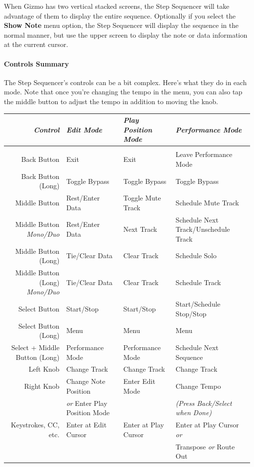 \documentclass{article}
\begin{document}
When Gizmo has two vertical stacked screens, the Step Sequencer will take advantage of them to display the entire sequence. Optionally if you select the {\bf Show Note} menu option, the Step Sequencer will display the sequence in the normal manner, but use the upper screen to display the note or data information at the current cursor.

\paragraph{Controls Summary}  The Step Sequencer's controls can be a bit complex.  Here's what they do in each mode.  Note that once you're changing the tempo in the menu, you can also tap the middle button to adjust the tempo in addition to moving the knob.

\vspace{1em}
\hspace{-3.5em} {\small
\begin{tabular}{@{}rlll@{}}
\it Control					& \it Edit Mode	& \it Play Position Mode	& \it Performance Mode\\
\hline\\[-0.5em]
Back Button				& Exit  & Exit & Leave Performance Mode\\
Back Button (Long)			& Toggle Bypass & Toggle Bypass & Toggle Bypass\\
Middle Button				& Rest/Enter Data & Toggle Mute Track & Schedule Mute Track\\
Middle Button {\it Mono/Duo}&Rest/Enter Data &Next Track&Schedule Next Track/Unschedule Track\\
Middle Button (Long)			& Tie/Clear Data & Clear Track & Schedule Solo\\
Middle Button (Long)	 {\it Mono/Duo}&Tie/Clear Data &Clear Track&Schedule Track\\
Select Button				& Start/Stop & Start/Stop & Start/Schedule Stop/Stop\\
Select Button (Long)			& Menu & Menu & Menu\\
Select + Middle Button (Long) 	&  Performance Mode &  Performance Mode & Schedule Next Sequence\\
Left Knob					& Change Track & Change Track & Change Track\\
Right Knob				& Change Note Position & Enter Edit Mode & Change Tempo\\
						& {\it or} Enter Play Position Mode && {\it (Press Back/Select when Done)}\\
Keystrokes, CC, etc.			& Enter at Edit Cursor&Enter at Play Cursor & Enter at Play Cursor {\it or}\\
						&				  &				   &Transpose {\it or} Route Out\\
\end{tabular}
}\\
\end{document}
